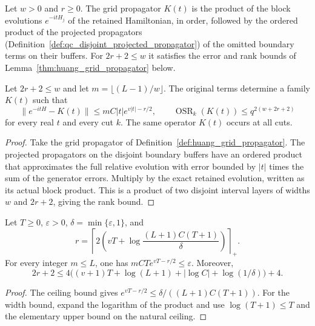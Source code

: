 \begin{definition}
    \label{def:huang_grid_propagator}
    \leanok
    Let $w>0$ and $r\ge0$. The grid propagator $K(t)$ is the product of the
    block evolutions $e^{-itH_j}$ of the retained Hamiltonian, in order,
    followed by the ordered product of the projected propagators
    (Definition~\ref{def:qc_disjoint_projected_propagator}) of the omitted
    boundary terms on their buffers. For $2r+2\le w$ it satisfies the error
    and rank bounds of Lemma~\ref{thm:huang_grid_propagator} below.
\end{definition}

\begin{lemma}
    \label{thm:huang_grid_propagator}
    \leanok
    Let $2r+2\le w$ and let $m=\lfloor(L-1)/w\rfloor$. The original terms determine
    a family $K(t)$ such that
    \[
        \|e^{-itH}-K(t)\|\le mC|t|e^{v|t|-r/2},\qquad
        \operatorname{OSR}_k(K(t))\le q^{2(w+2r+2)}
    \]
    for every real $t$ and every cut $k$. The same operator $K(t)$ occurs at all cuts.
\end{lemma}
\begin{proof}
    \leanok
    Take the grid propagator of Definition~\ref{def:huang_grid_propagator}.
    The projected propagators on the disjoint boundary buffers have an ordered
    product that approximates the full relative evolution with
    error bounded by $|t|$ times the sum of the generator errors. Multiply by the
    exact retained evolution, written as its actual block product. This is a product
    of two disjoint interval layers of widths $w$ and $2r+2$, giving the rank bound.
\end{proof}

\begin{lemma}
    \label{thm:huang_propagation_radius}
    \leanok
    Let $T\ge0$, $\varepsilon>0$, $\delta=\min\{\varepsilon,1\}$, and
    \[
        r=\left\lceil2\left(vT+
        \log\frac{(L+1)C(T+1)}{\delta}\right)\right\rceil_+.
    \]
    For every integer $m\le L$, one has $mCTe^{vT-r/2}\le\varepsilon$. Moreover,
    \[
        2r+2\le4\bigl((v+1)T+\log(L+1)+|\log C|+\log(1/\delta)\bigr)+4.
    \]
\end{lemma}
\begin{proof}
    \leanok
    The ceiling bound gives $e^{vT-r/2}\le\delta/((L+1)C(T+1))$.
    For the width bound, expand the logarithm of the product and use
    $\log(T+1)\le T$ and the elementary upper bound on the natural ceiling.
\end{proof}

